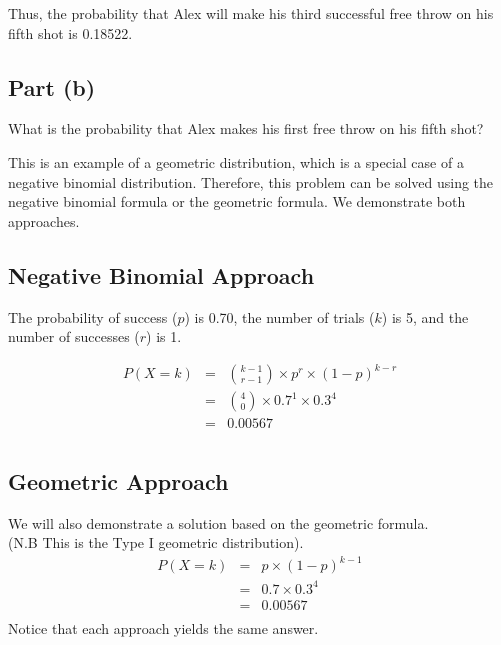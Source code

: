 \documentclass[a4paper,12pt]{article}
\begin{document}
\noindent Thus, the probability that Alex will make his third successful free throw on his fifth shot is 0.18522.

\newpage
\subsection*{Part (b)}
 What is the probability that Alex makes his first free throw on his fifth shot?\\
 \medskip

\noindent This is an example of a geometric distribution, which is a special case of a negative binomial distribution. Therefore, this problem can be solved using the negative binomial formula or the geometric formula. We demonstrate both approaches.


\subsection*{Negative Binomial Approach}

The probability of success ($p$) is 0.70, the number of trials ($k$) is 5, and the number of successes ($r$) is 1. 

\begin{eqnarray*}
P(X=k)  &=&  {k-1 \choose r-1} \times p^r \times (1-p)^{k - r} \\
 &=&  {4 \choose 0} \times 0.7^1 \times 0.3^{4}\\
 &=&  0.00567\\
\end{eqnarray*}

\newpage 
\subsection*{Geometric Approach}
We will also demonstrate a solution based on the geometric formula.\\ 
\noindent (N.B This is the Type I geometric distribution).
\begin{eqnarray*}
P(X=k)  &=&   p \times (1-p)^{k - 1}\\
 &=&  0.7 \times 0.3^4 \\
  &=&  0.00567\\
\end{eqnarray*}
Notice that each approach yields the same answer.
\end{document}
